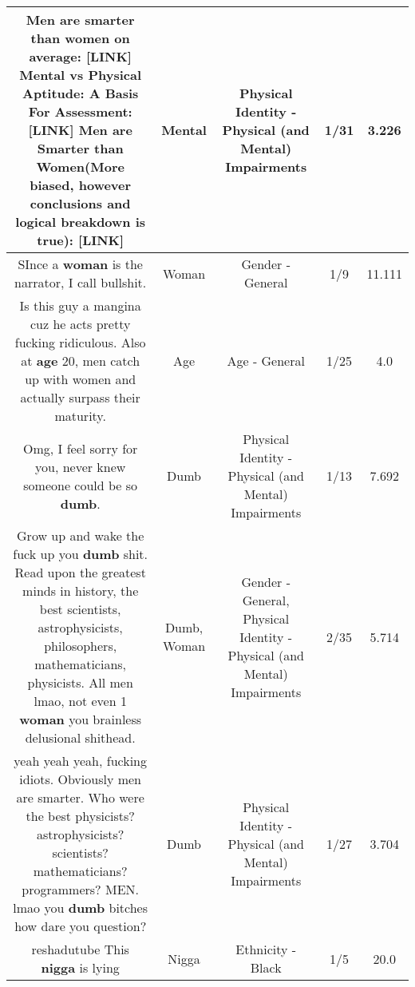 \documentclass[11pt]{article}
\newlength\mylength
\begin{document}
\begin{center}
\begin{longtable}{|C{.65\mylength}|C{.30\mylength}|C{.12\mylength}|C{.12\mylength}|C{.12\mylength}|}
  \small Men are smarter than women on average: [LINK] 
\textbf{Mental} vs Physical Aptitude: A Basis For Assessment: [LINK] 
Men are Smarter than Women(More biased, however conclusions and logical breakdown is true): [LINK] \normalsize   & Mental & Physical Identity - Physical (and Mental) Impairments & 1/31 & 3.226 \\  \hline
  \small SInce a \textbf{woman} is the narrator, I call bullshit.\normalsize   & Woman & Gender - General & 1/9 & 11.111 \\  \hline
  \small Is this guy a mangina cuz he acts pretty fucking ridiculous. Also at \textbf{age} 20, men catch up with women and actually surpass their maturity.\normalsize   & Age & Age - General & 1/25 & 4.0 \\  \hline
  \small Omg, I feel sorry for you, never knew someone could be so \textbf{dumb}.\normalsize   & Dumb & Physical Identity - Physical (and Mental) Impairments & 1/13 & 7.692 \\  \hline
  \small Grow up and wake the fuck up you \textbf{dumb} shit. Read upon the greatest minds in history, the best scientists, astrophysicists, philosophers, mathematicians, physicists. All men lmao, not even 1 \textbf{woman} you brainless delusional shithead.\normalsize   & Dumb, Woman & Gender - General, Physical Identity - Physical (and Mental) Impairments & 2/35 & 5.714 \\  \hline
  \small yeah yeah yeah, fucking idiots. Obviously men are smarter. Who were the best physicists? astrophysicists? scientists? mathematicians? programmers? MEN. lmao you \textbf{dumb} bitches how dare you question?\normalsize   & Dumb & Physical Identity - Physical (and Mental) Impairments & 1/27 & 3.704 \\  \hline
  \small reshadutube This \textbf{nigga} is lying\normalsize   & Nigga & Ethnicity - Black & 1/5 & 20.0 \\  \hline

\end{longtable}
\end{center}
\end{document}
